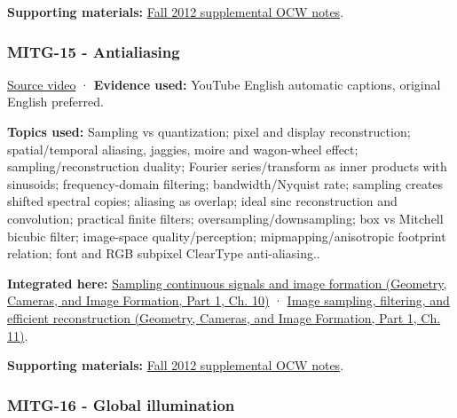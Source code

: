 \textbf{Supporting materials:} \href{https://ocw.mit.edu/courses/6-837-computer-graphics-fall-2012/pages/lecture-notes/}{Fall 2012 supplemental OCW notes}.

\subsubsection{MITG-15 - Antialiasing}\label{04-visual-computing-ii-ch036-mitg-15---antialiasing}

\hypertarget{04-visual-computing-ii-ch036-mitg-15---antialiasing}{}

\href{https://www.youtube.com/watch?v=eHXDosme1eo}{Source video} · \textbf{Evidence used:} YouTube English automatic captions, original English preferred.

\textbf{Topics used:} Sampling vs quantization; pixel and display reconstruction; spatial/temporal aliasing, jaggies, moire and wagon-wheel effect; sampling/reconstruction duality; Fourier series/transform as inner products with sinusoids; frequency-domain filtering; bandwidth/Nyquist rate; sampling creates shifted spectral copies; aliasing as overlap; ideal sinc reconstruction and convolution; practical finite filters; oversampling/downsampling; box vs Mitchell bicubic filter; image-space quality/perception; mipmapping/anisotropic footprint relation; font and RGB subpixel ClearType anti-aliasing..

\textbf{Integrated here:} \href{../03-Geometry-Cameras-and-Image-Formation-P01/main.pdf\#nameddest=03-visual-computing-i-ch003-sampling-continuous-signals-and-image-formation}{Sampling continuous signals and image formation (Geometry, Cameras, and Image Formation, Part 1, Ch. 10)} · \href{../03-Geometry-Cameras-and-Image-Formation-P01/main.pdf\#nameddest=03-visual-computing-i-ch004-image-sampling-filtering-and-efficient-reconstruction}{Image sampling, filtering, and efficient reconstruction (Geometry, Cameras, and Image Formation, Part 1, Ch. 11)}.

\textbf{Supporting materials:} \href{https://ocw.mit.edu/courses/6-837-computer-graphics-fall-2012/pages/lecture-notes/}{Fall 2012 supplemental OCW notes}.

\subsubsection{MITG-16 - Global illumination}\label{04-visual-computing-ii-ch036-mitg-16---global-illumination}

\hypertarget{04-visual-computing-ii-ch036-mitg-16---global-illumination}{}

